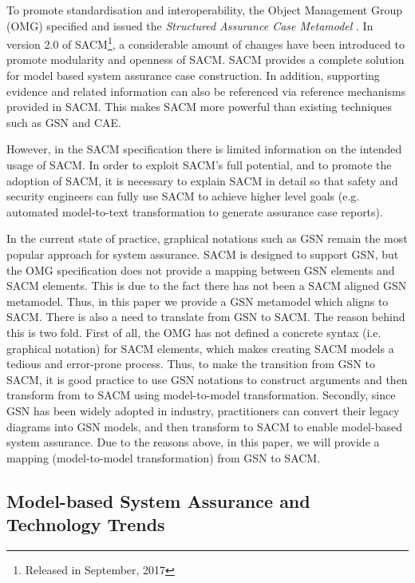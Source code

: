 To promote standardisation and interoperability, the Object Management Group (OMG) specified and issued the \textit{Structured Assurance Case Metamodel} \cite{sacm}. 
In version 2.0 of SACM\footnote{Released in September, 2017}, a considerable amount of changes have been introduced to promote modularity and openness of SACM. 
SACM provides a complete solution for model based system assurance case construction. 
In addition, supporting evidence and related information can also be referenced via reference mechanisms provided in SACM. 
This makes SACM more powerful than existing techniques such as GSN and CAE.

However, in the SACM specification there is limited information on the intended usage of SACM. 
In order to exploit SACM's full potential, and to promote the adoption of SACM, it is necessary to explain SACM in detail so that safety and security engineers can fully use SACM to achieve higher level goals (e.g. automated model-to-text transformation to generate assurance case reports). 

In the current state of practice, graphical notations such as GSN remain the most popular approach for system assurance. 
SACM is designed to support GSN, but the OMG specification does not provide a mapping between GSN elements and SACM elements. 
This is due to the fact there has not been a SACM aligned GSN metamodel. 
Thus, in this paper we provide a GSN metamodel which aligns to SACM. 
There is also a need to translate from GSN to SACM. 
The reason behind this is two fold. First of all, the OMG has not defined a concrete syntax (i.e. graphical notation) for SACM elements, which makes creating SACM models a tedious and error-prone process. 
Thus, to make the transition from GSN to SACM, it is good practice to use GSN notations to construct arguments and then transform from to SACM using model-to-model transformation. Secondly, since GSN has been widely adopted in industry, practitioners can convert their legacy diagrams into GSN models, and then transform to SACM to enable model-based system assurance. 
Due to the reasons above, in this paper, we will provide a mapping (model-to-model transformation) from GSN to SACM.

\subsection{Model-based System Assurance and Technology Trends}

